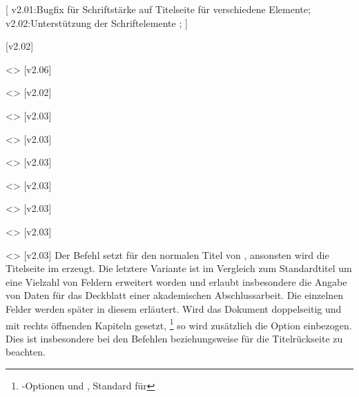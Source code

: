 \begin{DeclareEntity*}{}
\begin{DeclareEntity*}{}
\begin{DeclareEntity*}{}
\begin{Declaration}
  {}
  [
    v2.01:Bugfix für Schriftstärke auf Titelseite für verschiedene Elemente;
    v2.02:Unterstützung der Schriftelemente ;
  ]
\begin{Declaration}
  {}
  [v2.02]
\begin{Declaration}
  {}
  <>
  [v2.06]
\begin{Declaration}
  {}
  <>
  [v2.02]
\begin{Declaration}
  {}
  <>
  [v2.03]
\begin{Declaration}
  {}
  <>
  [v2.03]
\begin{Declaration}
  {}
  <>
  [v2.03]
\begin{Declaration}
  {}
  <>
  [v2.03]
\begin{Declaration}
  {}
  <>
  [v2.03]
\begin{Declaration}
  {}
  <>
  [v2.03]
\begin{Declaration}
  {}
  <>
  [v2.03]
Der Befehl  setzt für  den normalen 
Titel von \KOMAScript, ansonsten wird die Titelseite im \TUDCD erzeugt. Die 
letztere Variante ist im Vergleich zum Standardtitel um eine Vielzahl von 
Feldern erweitert worden und erlaubt insbesondere die Angabe von Daten für das 
Deckblatt einer akademischen Abschlussarbeit. Die einzelnen Felder werden 
später in diesem \autorefname erläutert. Wird das Dokument doppelseitig und mit 
rechts öffnenden Kapiteln gesetzt,%
\footnote{%
  \KOMAScript-Optionen  und , 
  Standard für %
}
so wird zusätzlich die Option  einbezogen. Dies 
ist insbesondere bei den Befehlen  beziehungsweise 
 für die Titelrückseite zu beachten.


\end{Declaration}
\end{Declaration}
\end{Declaration}
\end{Declaration}
\end{Declaration}
\end{Declaration}
\end{Declaration}
\end{Declaration}
\end{Declaration}
\end{Declaration}
\end{Declaration}
\end{DeclareEntity*}
\end{DeclareEntity*}
\end{DeclareEntity*}
